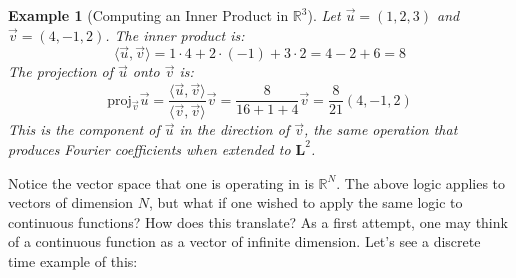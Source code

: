 \documentclass[12pt,a4paper]{report}
\theoremstyle{thms}
\theoremstyle{defns}
\newtheorem{example}{Example}[section]
\begin{document}
\begin{example}[Computing an Inner Product in $\mathbb{R}^3$]
    Let $\vec{u} = (1, 2, 3)$ and $\vec{v} = (4, -1, 2)$. The inner product is:
    \begin{equation}
        \langle \vec{u}, \vec{v} \rangle = 1 \cdot 4 + 2 \cdot (-1) + 3 \cdot 2 = 4 - 2 + 6 = 8
    \end{equation}
    The projection of $\vec{u}$ onto $\vec{v}$ is:
    \begin{equation}
        \mathrm{proj}_{\vec{v}}\vec{u} = \dfrac{\langle \vec{u}, \vec{v} \rangle}{\langle \vec{v}, \vec{v} \rangle}\vec{v} = \dfrac{8}{16 + 1 + 4}\vec{v} = \dfrac{8}{21}(4, -1, 2)
    \end{equation}
    This is the component of $\vec{u}$ in the direction of $\vec{v}$, the same operation that produces Fourier coefficients when extended to $\mathbf{L}^2$.
\end{example}

Notice the vector space that one is operating in is $\mathbb{R}^N$. The above logic applies to vectors of dimension $N$, but what if one wished to apply the same logic to continuous functions? How does this translate? As a first attempt, one may think of a continuous function as a vector of infinite dimension. Let's see a discrete time example of this:
\end{document}
